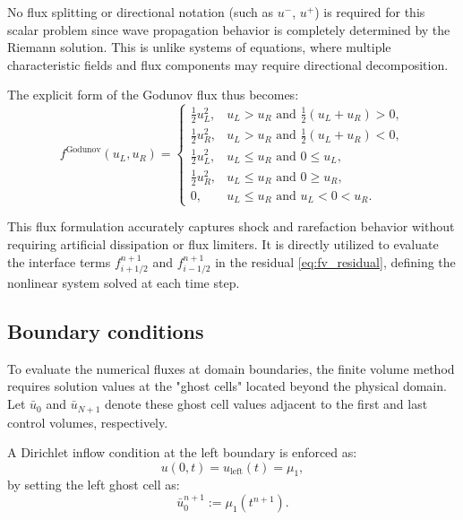No flux splitting or directional notation (such as \( u^- \), \( u^+ \)) is required for this scalar problem since wave propagation behavior is completely determined by the Riemann solution. This is unlike systems of equations, where multiple characteristic fields and flux components may require directional decomposition.

The explicit form of the Godunov flux thus becomes:
\begin{equation}
f^{\text{Godunov}}(u_L, u_R) =
\begin{cases}
\frac{1}{2} u_L^2, & u_L > u_R \text{ and } \frac{1}{2}(u_L + u_R) > 0, \\
\frac{1}{2} u_R^2, & u_L > u_R \text{ and } \frac{1}{2}(u_L + u_R) < 0, \\
\frac{1}{2} u_L^2, & u_L \le u_R \text{ and } 0 \le u_L, \\
\frac{1}{2} u_R^2, & u_L \le u_R \text{ and } 0 \ge u_R, \\
0,                & u_L \le u_R \text{ and } u_L < 0 < u_R.
\end{cases}
\label{eq:godunov_flux}
\end{equation}

This flux formulation accurately captures shock and rarefaction behavior without requiring artificial dissipation or flux limiters. It is directly utilized to evaluate the interface terms \( f_{i+1/2}^{n+1} \) and \( f_{i-1/2}^{n+1} \) in the residual \eqref{eq:fv_residual}, defining the nonlinear system solved at each time step.

\subsection{Boundary conditions}

To evaluate the numerical fluxes at domain boundaries, the finite volume method requires solution values at the "ghost cells" located beyond the physical domain. Let \( \bar{u}_0 \) and \( \bar{u}_{N+1} \) denote these ghost cell values adjacent to the first and last control volumes, respectively.

A Dirichlet inflow condition at the left boundary is enforced as:
\begin{equation}
u(0,t) = u_{\text{left}}(t) = \mu_1,\end{equation}
by setting the left ghost cell as:
\begin{equation}\bar{u}_0^{n+1} := \mu_1(t^{n+1}).\end{equation}

